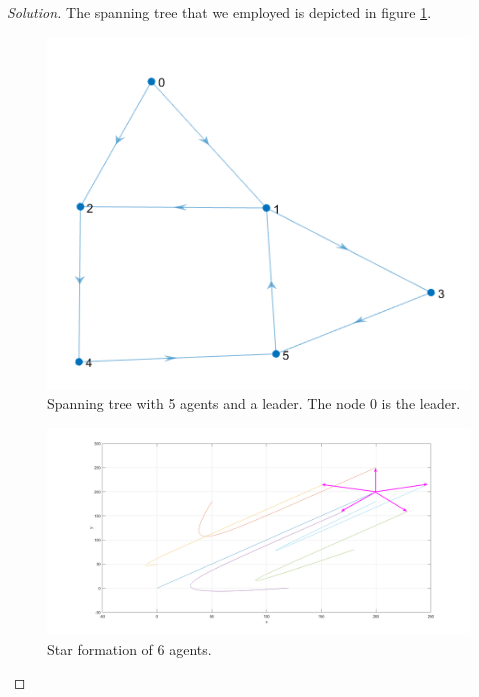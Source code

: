\documentclass[12pt]{article}
\newenvironment{solution}{\begin{proof}[Solution]}{\end{proof}}
\begin{document}
\begin{solution}
The spanning tree that we employed is depicted in figure \ref{graph}.
\begin{figure}[!h]
	\includegraphics[scale=0.48]{figures/SpanningTree.png}
	\centering
	\caption{Spanning tree with 5 agents and a leader. The node $0$ is the leader.}
	\label{graph}
\end{figure}
\begin{figure}[!h]
	\includegraphics[scale=0.35]{figures/StarFormation.png}
	\centering
	\caption{Star formation of 6 agents.}
	\label{star_xy}
\end{figure}


\end{solution}
\end{document}
